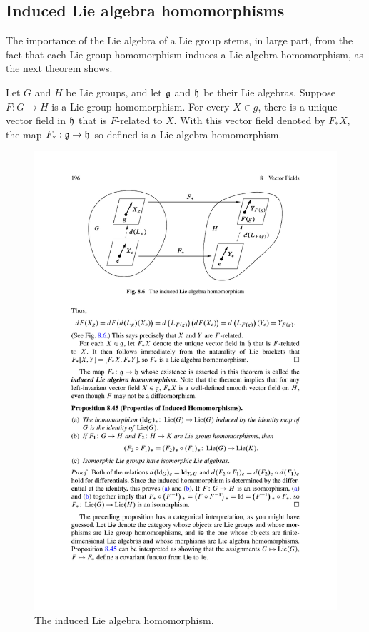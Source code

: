 \subsection{Induced Lie algebra homomorphisms}
The importance of the Lie algebra of a Lie group stems, in large part, from the fact that each Lie group homomorphism induces a Lie algebra homomorphism, as the next theorem shows.
\begin{theorem}\label{Lie algebra induce}
Let $G$ and $H$ be Lie groups, and let $\mathfrak{g}$ and $\mathfrak{h}$ be their Lie algebras. Suppose $F:G\to H$ is a Lie group homomorphism. For every $X\in g$, there is a unique vector field in $\mathfrak{h}$ that is $F$-related to $X$. With this vector field denoted by $F_*X$, the map $F_*:\mathfrak{g}\to\mathfrak{h}$ so defined is a Lie algebra homomorphism.
\end{theorem}
\begin{figure}[htbp]
\centering
\includegraphics{pictures/induced-Lie-homo}
\caption{The induced Lie algebra homomorphism.}
\end{figure}

